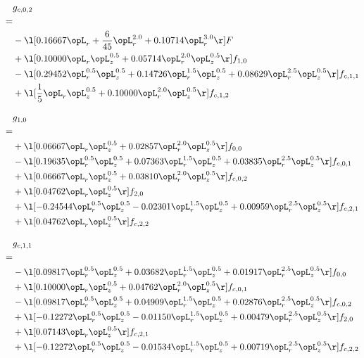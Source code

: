 \begin{alignat}{2} 
\label{eq:g_02_0} 
& g_{c,0,2} \nonumber \\ 
 = \\ 
& - \l[  0.16667 \opL_r + \frac{6}{45} \opL_r^{2.0} +  0.10714 \opL_r^{3.0}  \r] F \nonumber \\ 
& + \l[  0.10000 \opL_r \opL_z^{0.5} +  0.05714 \opL_r^{2.0} \opL_z^{0.5}  \r] f_{1,0} \nonumber \\ 
& - \l[  0.29452 \opL_r^{0.5} \opL_z^{0.5} +  0.14726 \opL_r^{1.5} \opL_z^{0.5} +  0.08629 \opL_r^{2.5} \opL_z^{0.5}  \r] f_{c,1,1} \nonumber \\ 
& + \l[ \frac{1}{5} \opL_r \opL_z^{0.5} +  0.10000 \opL_r^{2.0} \opL_z^{0.5}  \r] f_{c,1,2} \nonumber \\ 
\end{alignat} 


\begin{alignat}{2} 
\label{eq:g_10_0} 
& g_{1,0} \nonumber \\ 
 = \\ 
& + \l[  0.06667 \opL_r \opL_z^{0.5} +  0.02857 \opL_r^{2.0} \opL_z^{0.5}  \r] f_{0,0} \nonumber \\ 
& - \l[  0.19635 \opL_r^{0.5} \opL_z^{0.5} +  0.07363 \opL_r^{1.5} \opL_z^{0.5} +  0.03835 \opL_r^{2.5} \opL_z^{0.5}  \r] f_{c,0,1} \nonumber \\ 
& + \l[  0.06667 \opL_r \opL_z^{0.5} +  0.03810 \opL_r^{2.0} \opL_z^{0.5}  \r] f_{c,0,2} \nonumber \\ 
& + \l[  0.04762 \opL_r \opL_z^{0.5}  \r] f_{2,0} \nonumber \\ 
& + \l[  -0.24544 \opL_r^{0.5} \opL_z^{0.5}   -0.02301 \opL_r^{1.5} \opL_z^{0.5} +  0.00959 \opL_r^{2.5} \opL_z^{0.5}  \r] f_{c,2,1} \nonumber \\ 
& + \l[  0.04762 \opL_r \opL_z^{0.5}  \r] f_{c,2,2} \nonumber \\ 
\end{alignat} 


\begin{alignat}{2} 
\label{eq:g_11_0} 
& g_{c,1,1} \nonumber \\ 
 = \\ 
& - \l[  0.09817 \opL_r^{0.5} \opL_z^{0.5} +  0.03682 \opL_r^{1.5} \opL_z^{0.5} +  0.01917 \opL_r^{2.5} \opL_z^{0.5}  \r] f_{0,0} \nonumber \\ 
& + \l[  0.10000 \opL_r \opL_z^{0.5} +  0.04762 \opL_r^{2.0} \opL_z^{0.5}  \r] f_{c,0,1} \nonumber \\ 
& - \l[  0.09817 \opL_r^{0.5} \opL_z^{0.5} +  0.04909 \opL_r^{1.5} \opL_z^{0.5} +  0.02876 \opL_r^{2.5} \opL_z^{0.5}  \r] f_{c,0,2} \nonumber \\ 
& + \l[  -0.12272 \opL_r^{0.5} \opL_z^{0.5}   -0.01150 \opL_r^{1.5} \opL_z^{0.5} +  0.00479 \opL_r^{2.5} \opL_z^{0.5}  \r] f_{2,0} \nonumber \\ 
& + \l[  0.07143 \opL_r \opL_z^{0.5}  \r] f_{c,2,1} \nonumber \\ 
& + \l[  -0.12272 \opL_r^{0.5} \opL_z^{0.5}   -0.01534 \opL_r^{1.5} \opL_z^{0.5} +  0.00719 \opL_r^{2.5} \opL_z^{0.5}  \r] f_{c,2,2} \nonumber \\ 
\end{alignat} 


